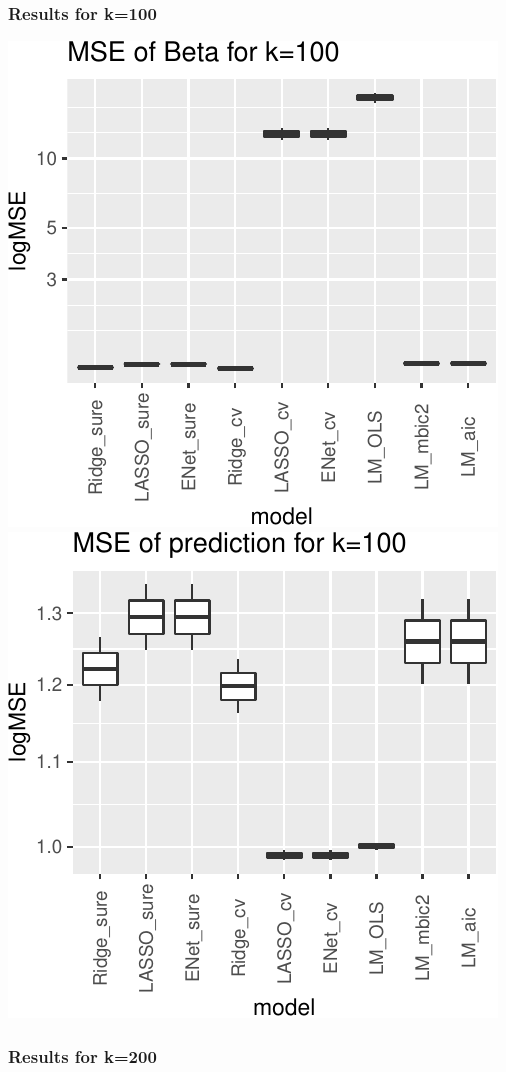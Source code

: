 \documentclass[
]{article}
\begin{document}
\hypertarget{results-for-k100-1}{%
\subsubsection{Results for k=100}\label{results-for-k100-1}}

\includegraphics[width=0.8\linewidth]{report_files/figure-latex/unnamed-chunk-7-3}
\includegraphics[width=0.8\linewidth]{report_files/figure-latex/unnamed-chunk-7-4}

\hypertarget{results-for-k200-1}{%
\subsubsection{Results for k=200}\label{results-for-k200-1}}
\end{document}
